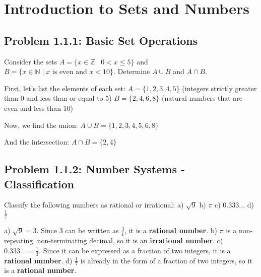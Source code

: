 
\section{Introduction to Sets and Numbers} %

\subsection*{Problem 1.1.1: Basic Set Operations}
Consider the sets $A = \{x \in \mathbb{Z} \mid 0 < x \le 5\}$ and $B = \{x \in \mathbb{N} \mid x \text{ is even and } x < 10\}$.
Determine $A \cup B$ and $A \cap B$.

\begin{solution}
First, let's list the elements of each set:
$A = \{1, 2, 3, 4, 5\}$ (integers strictly greater than 0 and less than or equal to 5)
$B = \{2, 4, 6, 8\}$ (natural numbers that are even and less than 10)

Now, we find the union:
$A \cup B = \{1, 2, 3, 4, 5, 6, 8\}$

And the intersection:
$A \cap B = \{2, 4\}$
\end{solution}

\subsection*{Problem 1.1.2: Number Systems - Classification}
Classify the following numbers as rational or irrational:
a) $\sqrt{9}$
b) $\pi$
c) $0.333\dots$
d) $\frac{1}{7}$

\begin{solution}
a) $\sqrt{9} = 3$. Since $3$ can be written as $\frac{3}{1}$, it is a \textbf{rational number}.
b) $\pi$ is a non-repeating, non-terminating decimal, so it is an \textbf{irrational number}.
c) $0.333\dots = \frac{1}{3}$. Since it can be expressed as a fraction of two integers, it is a \textbf{rational number}.
d) $\frac{1}{7}$ is already in the form of a fraction of two integers, so it is a \textbf{rational number}.
\end{solution}

